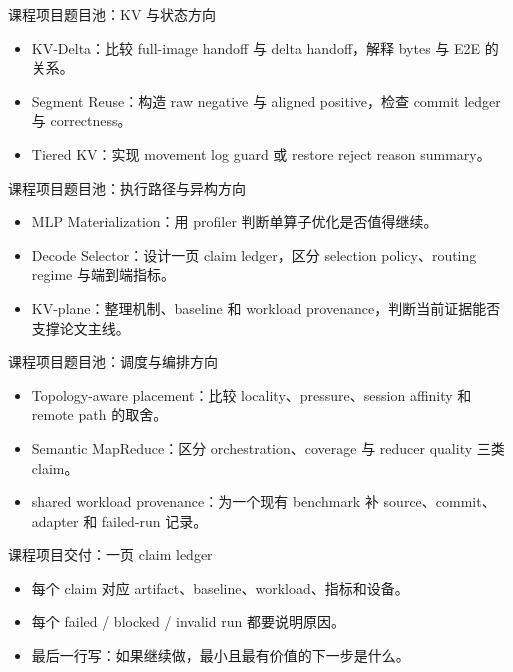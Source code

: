 \begin{frame}{课程项目题目池：KV 与状态方向}
  \begin{itemize}
    \item KV-Delta：比较 full-image handoff 与 delta handoff，解释 bytes 与 E2E 的关系。
    \item Segment Reuse：构造 raw negative 与 aligned positive，检查 commit ledger 与 correctness。
    \item Tiered KV：实现 movement log guard 或 restore reject reason summary。
  \end{itemize}
\end{frame}

\begin{frame}{课程项目题目池：执行路径与异构方向}
  \begin{itemize}
    \item MLP Materialization：用 profiler 判断单算子优化是否值得继续。
    \item Decode Selector：设计一页 claim ledger，区分 selection policy、routing regime 与端到端指标。
    \item KV-plane：整理机制、baseline 和 workload provenance，判断当前证据能否支撑论文主线。
  \end{itemize}
\end{frame}

\begin{frame}{课程项目题目池：调度与编排方向}
  \begin{itemize}
    \item Topology-aware placement：比较 locality、pressure、session affinity 和 remote path 的取舍。
    \item Semantic MapReduce：区分 orchestration、coverage 与 reducer quality 三类 claim。
    \item shared workload provenance：为一个现有 benchmark 补 source、commit、adapter 和 failed-run 记录。
  \end{itemize}
\end{frame}

\begin{frame}{课程项目交付：一页 claim ledger}
  \begin{itemize}
    \item 每个 claim 对应 artifact、baseline、workload、指标和设备。
    \item 每个 failed / blocked / invalid run 都要说明原因。
    \item 最后一行写：如果继续做，最小且最有价值的下一步是什么。
  \end{itemize}
\end{frame}

